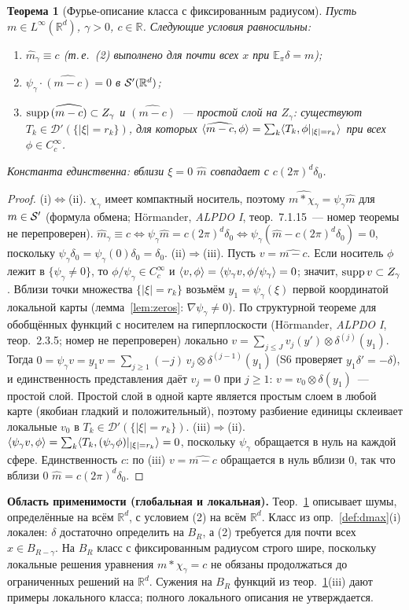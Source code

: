 \documentclass[11pt,a4paper]{article}
\numberwithin{equation}{section}
\newtheorem{theorem}{Теорема}[section]
\theoremstyle{definition}
\theoremstyle{remark}
\newcommand{\E}{\mathbb E}\newcommand{\R}{\mathbb R}\newcommand{\N}{\mathbb N}\let\Prob\relax\newcommand{\Prob}{\mathbb P}
\begin{document}
\begin{theorem}[Фурье-описание класса с фиксированным радиусом]\label{thm:fourier}
Пусть $m\in L^\infty(\R^d)$, $\gamma>0$, $c\in\R$. Следующие условия равносильны:
\begin{enumerate}[label=(\roman*)]
\item $\hat m_\gamma\equiv c$ (т.\,е.\ (2) выполнено для почти всех $x$ при $\E_\pi\delta=m$);
\item $\psi_\gamma\cdot\widehat{(m-c)}=0$ в $\cS'(\R^d)$;
\item $\operatorname{supp}\widehat{(m-c)}\subset Z_\gamma$ и $\widehat{(m-c)}$~--- простой слой на $Z_\gamma$: существуют $T_k\in\mathcal D'(\{|\xi|=r_k\})$, для которых $\langle \widehat{m-c},\phi\rangle=\sum_k\langle T_k,\phi|_{|\xi|=r_k}\rangle$ при всех $\phi\in C_c^\infty$.
\end{enumerate}
Константа единственна: вблизи $\xi=0$ $\hat m$ совпадает с $c(2\pi)^d\delta_0$.
\end{theorem}
\begin{proof}
(i)$\iff$(ii). $\chi_\gamma$ имеет компактный носитель, поэтому $\widehat{m*\chi_\gamma}=\psi_\gamma\hat m$ для $m\in\mathcal S'$ (формула обмена; Hörmander, \emph{ALPDO I}, теор.~7.1.15~--- номер теоремы не перепроверен). $\hat m_\gamma\equiv c\iff\psi_\gamma\hat m=c(2\pi)^d\delta_0\iff\psi_\gamma(\hat m-c(2\pi)^d\delta_0)=0$, поскольку $\psi_\gamma\delta_0=\psi_\gamma(0)\delta_0=\delta_0$.
(ii)$\Rightarrow$(iii). Пусть $v=\widehat{m-c}$. Если носитель $\phi$ лежит в $\{\psi_\gamma\ne0\}$, то $\phi/\psi_\gamma\in C_c^\infty$ и $\langle v,\phi\rangle=\langle \psi_\gamma v,\phi/\psi_\gamma\rangle=0$; значит, $\operatorname{supp} v\subset Z_\gamma$. Вблизи точки множества $\{|\xi|=r_k\}$ возьмём $y_1=\psi_\gamma(\xi)$ первой координатой локальной карты (лемма~\ref{lem:zeros}: $\nabla\psi_\gamma\ne0$). По структурной теореме для обобщённых функций с носителем на гиперплоскости (Hörmander, \emph{ALPDO I}, теор.~2.3.5; номер не перепроверен) локально $v=\sum_{j\le J}v_j(y')\otimes\delta^{(j)}(y_1)$. Тогда $0=\psi_\gamma v=y_1v=\sum_{j\ge1}(-j)\,v_j\otimes\delta^{(j-1)}(y_1)$ (S6 проверяет $y_1\delta'=-\delta$), и единственность представления даёт $v_j=0$ при $j\ge1$: $v=v_0\otimes\delta(y_1)$~--- простой слой. Простой слой в одной карте является простым слоем в любой карте (якобиан гладкий и положительный), поэтому разбиение единицы склеивает локальные $v_0$ в $T_k\in\mathcal D'(\{|\xi|=r_k\})$.
(iii)$\Rightarrow$(ii). $\langle \psi_\gamma v,\phi\rangle=\sum_k\langle T_k,(\psi_\gamma\phi)|_{|\xi|=r_k}\rangle=0$, поскольку $\psi_\gamma$ обращается в нуль на каждой сфере.
Единственность $c$: по (iii) $v=\widehat{m-c}$ обращается в нуль вблизи $0$, так что вблизи $0$ $\hat m=c(2\pi)^d\delta_0$.
\end{proof}
\noindent\textbf{Область применимости (глобальная и локальная).} Теор.~\ref{thm:fourier} описывает шумы, определённые на всём $\R^d$, с условием (2) на всём $\R^d$. Класс из опр.~\ref{def:dmax}(i) локален: $\delta$ достаточно определить на $B_R$, а (2) требуется для почти всех $x\in B_{R-\gamma}$. На $B_R$ класс с фиксированным радиусом строго шире, поскольку локальные решения уравнения $m*\chi_\gamma=c$ не обязаны продолжаться до ограниченных решений на $\R^d$. Сужения на $B_R$ функций из теор.~\ref{thm:fourier}(iii) дают примеры локального класса; полного локального описания не утверждается.
\end{document}
